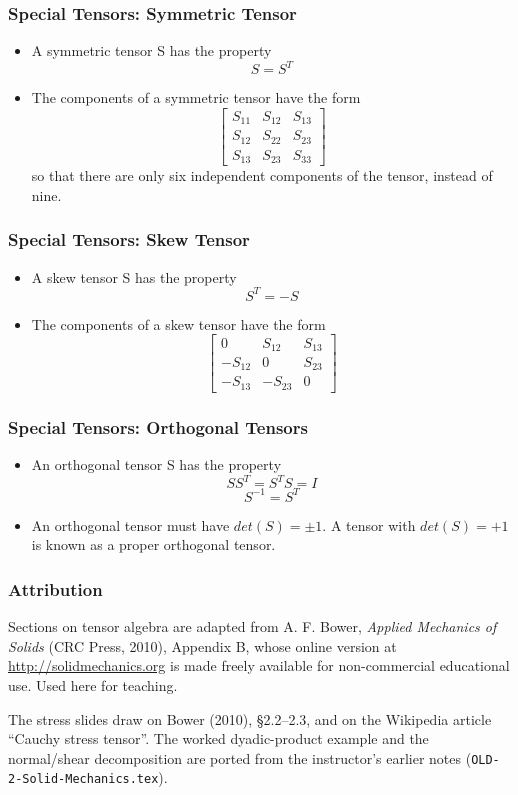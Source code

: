 \documentclass[aspectratio=169,11pt]{beamer}
\begin{document}
\begin{frame}
\frametitle{Special Tensors: Symmetric Tensor}
\begin{itemize}
    \item A symmetric tensor S has the property
    \[
    S = S^T
    \]
    \item The components of a symmetric tensor have the form
    \[
    \begin{bmatrix}
        S_{11} & S_{12} & S_{13} \\
        S_{12} & S_{22} & S_{23} \\
        S_{13} & S_{23} & S_{33}
    \end{bmatrix}
    \]
    so that there are only six independent components of the tensor, instead of nine.
\end{itemize}
\end{frame}

\begin{frame}
\frametitle{Special Tensors: Skew Tensor}
\begin{itemize}
    \item A skew tensor S has the property
    \[
    S^T = -S
    \]
    \item The components of a skew tensor have the form
    \[
    \begin{bmatrix}
        0 & S_{12} & S_{13} \\
        -S_{12} & 0 & S_{23} \\
        -S_{13} & -S_{23} & 0
    \end{bmatrix}
    \]
\end{itemize}
\end{frame}

\begin{frame}
\frametitle{Special Tensors: Orthogonal Tensors}
\begin{itemize}
    \item An orthogonal tensor S has the property
    \[
    S S^T = S^T S = I
    \]
    \[
    S^{-1} = S^T
    \]
    \item An orthogonal tensor must have \(det(S) = \pm 1\). A tensor with \(det(S) = +1\) is known as a proper orthogonal tensor.
\end{itemize}
\end{frame}

\begin{frame}
\frametitle{Attribution}
Sections on tensor algebra are adapted from A. F. Bower, \emph{Applied Mechanics of Solids}
(CRC Press, 2010), Appendix B, whose online version at \url{http://solidmechanics.org}
is made freely available for non-commercial educational use. Used here for teaching.

\medskip
The stress slides draw on Bower (2010), \S2.2--2.3, and on the Wikipedia article ``Cauchy stress tensor''. The worked dyadic-product example and the normal/shear decomposition are ported from the instructor's earlier notes (\texttt{OLD-2-Solid-Mechanics.tex}).
\end{frame}
\end{document}
